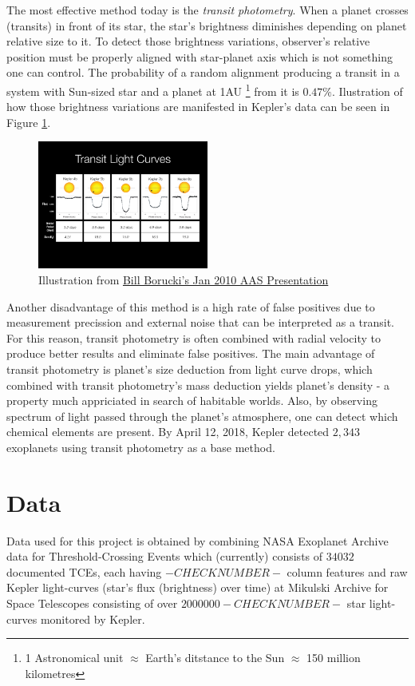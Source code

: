 \documentclass[twoside]{article}
\begin{document}
\begin{multicols}{2}
The most effective method today is the \textit{transit photometry}. When a planet crosses (transits) in front of its star, the star's brightness diminishes depending on planet relative size to it. To detect those brightness variations, observer's relative position must be properly aligned with star-planet axis which is not something one can control. The probability of a random alignment producing a transit in a system with Sun-sized star and a planet at 1AU \footnote{1 Astronomical unit $\approx$ Earth's ditstance to the Sun $\approx$ 150 million kilometres} from it is $0.47\%$. Ilustration of how those brightness variations are manifested in Kepler's data can be seen in Figure \ref{fig:kepler_curves}.
\begin{figure}[H]
\includegraphics[width=0.5\textwidth]{KeplerLightCurves}
\caption{Illustration from \href{https://www.nasa.gov/mission_pages/kepler/main/index.html?FuseAction=ShowNews&NewsID=16}{Bill Borucki's Jan 2010 AAS Presentation}}
\label{fig:kepler_curves}
\end{figure}
\noindent Another disadvantage of this method is a high rate of false positives due to measurement precission and external noise that can be interpreted as a transit. For this reason, transit photometry is often combined with radial velocity to produce better results and eliminate false positives. The main advantage of transit photometry is planet's size deduction from light curve drops, which combined with transit photometry's mass deduction yields planet's density - a property much appriciated in search of habitable worlds. Also, by observing spectrum of light passed through the planet's atmosphere, one can detect which chemical elements are present. By April 12, 2018, Kepler detected $2,343$ exoplanets using transit photometry as a base method.



\section{Data}
Data used for this project is obtained by combining NASA Exoplanet Archive data for Threshold-Crossing Events which (currently) consists of $34032$ documented TCEs, each having $-CHECKNUMBER-$ column features and raw Kepler light-curves (star's flux (brightness) over time) at Mikulski Archive for Space Telescopes consisting of over $2000000 -CHECKNUMBER-$ star light-curves monitored by Kepler.


\end{multicols}
\end{document}
